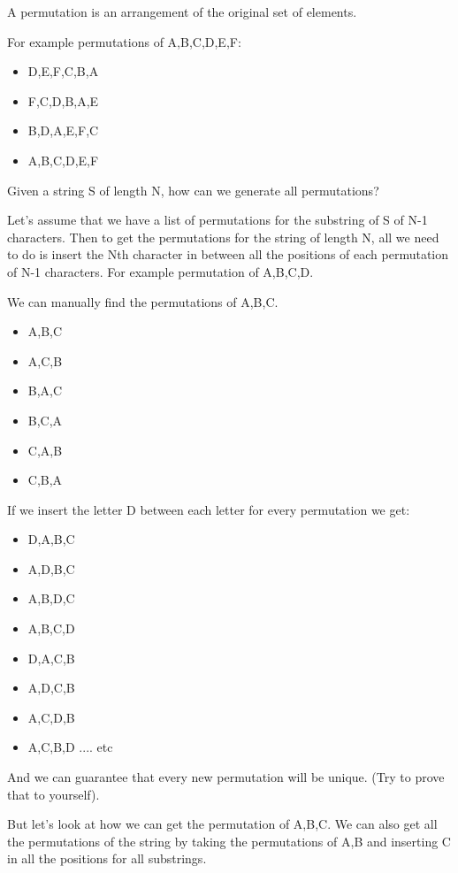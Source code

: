 \documentclass[11pt,oneside]{book}
\begin{document}
A permutation is an arrangement of the original set of elements.

For example permutations of A,B,C,D,E,F:

\begin{itemize}
\item D,E,F,C,B,A
\item F,C,D,B,A,E
\item B,D,A,E,F,C
\item A,B,C,D,E,F
\end{itemize}

Given a string S of length N, how can we generate all permutations?

Let's assume that we have a list of permutations for the substring of S of N-1 characters. Then to get the permutations for the string of length N, all we need to do is insert the Nth character in between all the positions of each permutation of N-1 characters. For example permutation of A,B,C,D.

We can manually find the permutations of A,B,C.

\begin{itemize}
\item A,B,C
\item A,C,B
\item B,A,C
\item B,C,A
\item C,A,B
\item C,B,A
\end{itemize}

If we insert the letter D between each letter for every permutation we get:

\begin{itemize}
\item D,A,B,C
\item A,D,B,C
\item A,B,D,C
\item A,B,C,D
\item D,A,C,B
\item A,D,C,B
\item A,C,D,B
\item A,C,B,D
.... etc
\end{itemize}

And we can guarantee that every new permutation will be unique. (Try to prove that to yourself).

But let's look at how we can get the permutation of A,B,C. We can also get all the permutations of the string by taking the permutations of A,B and inserting C in all the positions for all substrings.
\end{document}
